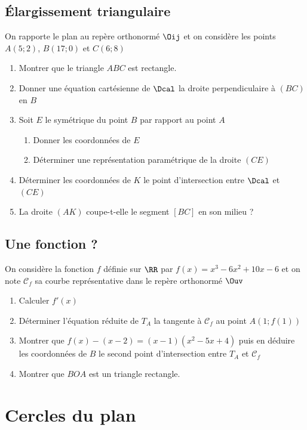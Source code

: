 \documentclass[oneside,12pt]{book}          %
\begin{document}
\subsection{Élargissement triangulaire}
On rapporte le plan au repère orthonormé $\Oij$ et on considère les points $A(5;2)$, $B(17;0)$ et $C(6;8)$
\begin{enumerate}
    \item Montrer que le triangle $ABC$ est rectangle.
    \item Donner une équation cartésienne de $\Dcal$ la droite perpendiculaire à $(BC)$ en $B$
    \item Soit $E$ le symétrique du point $B$ par rapport au point $A$
    \begin{enumerate}
        \item Donner les coordonnées de $E$
        \item Déterminer une représentation paramétrique de la droite $(CE)$
    \end{enumerate}
    \item Déterminer les coordonnées de $K$ le point d'intersection entre $\Dcal$ et $(CE)$
    \item La droite $(AK)$ coupe-t-elle le segment $[BC]$ en son milieu ?
\end{enumerate}



\subsection{Une fonction ?}
 On considère la fonction $f$ définie sur $\RR$ par $f(x)=x^{3}-6x^{2}+10x-6 $ et on note $\mathscr{C}_{f}$ sa courbe représentative dans le repère orthonormé $\Ouv$
\begin{enumerate}
    \item Calculer $f'(x)$
    \item Déterminer l'équation réduite de $T_{A}$ la tangente à $\mathscr{C}_{f}$ au point $A(1;f(1))$
    \item Montrer que $f(x)-(x-2) = (x-1)(x^{2}-5x+4) $ puis en déduire les coordonnées de $B$ le second point d'intersection entre $T_{A}$ et $\mathscr{C}_{f}$
    \item Montrer que $BOA$ est un triangle rectangle.
\end{enumerate}



\section{Cercles du plan}
\end{document}
